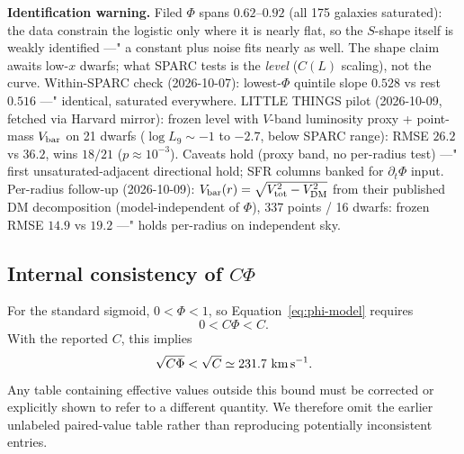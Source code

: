 \documentclass[twocolumn]{aastex631}
\begin{document}
\textbf{Identification warning.} Filed $\Phi$ spans $0.62$--$0.92$ (all 175 galaxies saturated): the data constrain the logistic only where it is nearly flat, so the $S$-shape itself is weakly identified ---" a constant plus noise fits nearly as well. The shape claim awaits low-$x$ dwarfs; what SPARC tests is the \emph{level} ($C(L)$ scaling), not the curve. Within-SPARC check (2026-10-07): lowest-$\Phi$ quintile slope $0.528$ vs rest $0.516$ ---" identical, saturated everywhere. LITTLE THINGS pilot \cite{Oh2015} (2026-10-09, fetched via Harvard mirror): frozen level with $V$-band luminosity proxy + point-mass $V_{\rm bar}$ on 21 dwarfs ($\log L_9\sim-1$ to $-2.7$, below SPARC range): RMSE $26.2$ vs $36.2$, wins $18/21$ ($p\approx10^{-3}$). Caveats hold (proxy band, no per-radius test) ---" first unsaturated-adjacent directional hold; SFR columns banked for $\partial_t\Phi$ input. Per-radius follow-up (2026-10-09): $V_{\rm bar}(r)=\sqrt{V_{\rm tot}^2-V_{\rm DM}^2}$ from their published DM decomposition (model-independent of $\Phi$), 337 points / 16 dwarfs: frozen RMSE $\mathbf{14.9}$ vs $19.2$ ---" holds per-radius on independent sky.

\subsection{Internal consistency of $C\Phi$}
For the standard sigmoid, $0<\Phi<1$, so Equation~\eqref{eq:phi-model} requires
\[
0<C\Phi<C.
\]
With the reported $C$, this implies
\[
\sqrt{C\Phi}<\sqrt C\simeq231.7\ {\rm km\,s^{-1}}.
\]
Any table containing effective values outside this bound must be corrected or explicitly shown to refer to a different quantity. We therefore omit the earlier unlabeled paired-value table rather than reproducing potentially inconsistent entries.
\end{document}
